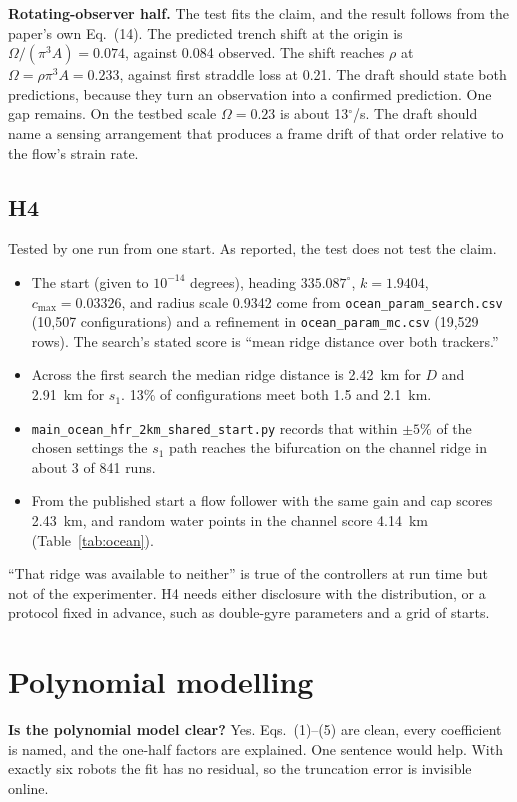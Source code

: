 \documentclass[10.5pt]{article}
\begin{document}
\textbf{Rotating-observer half.} The test fits the claim, and the result follows from the paper's own Eq.~(14). The predicted trench shift at the origin is $\Omega/(\pi^3A)=0.074$, against 0.084 observed. The shift reaches $\rho$ at $\Omega=\rho\pi^3A=0.233$, against first straddle loss at 0.21. The draft should state both predictions, because they turn an observation into a confirmed prediction. One gap remains. On the testbed scale $\Omega=0.23$ is about 13$^\circ$/s. The draft should name a sensing arrangement that produces a frame drift of that order relative to the flow's strain rate.

\subsection{H4}
Tested by one run from one start. As reported, the test does not test the claim.
\begin{itemize}[leftmargin=1.2em]
\item The start (given to $10^{-14}$ degrees), heading $335.087^\circ$, $k=1.9404$, $c_{\max}=0.03326$, and radius scale 0.9342 come from \texttt{ocean\_param\_search.csv} (10{,}507 configurations) and a refinement in \texttt{ocean\_param\_mc.csv} (19{,}529 rows). The search's stated score is ``mean ridge distance over both trackers.''
\item Across the first search the median ridge distance is 2.42~km for $D$ and 2.91~km for $s_1$. 13\% of configurations meet both 1.5 and 2.1~km.
\item \texttt{main\_ocean\_hfr\_2km\_shared\_start.py} records that within $\pm5\%$ of the chosen settings the $s_1$ path reaches the bifurcation on the channel ridge in about 3 of 841 runs.
\item From the published start a flow follower with the same gain and cap scores 2.43~km, and random water points in the channel score 4.14~km (Table~\ref{tab:ocean}).
\end{itemize}
``That ridge was available to neither'' is true of the controllers at run time but not of the experimenter. H4 needs either disclosure with the distribution, or a protocol fixed in advance, such as double-gyre parameters and a grid of starts.

\section{Polynomial modelling}

\textbf{Is the polynomial model clear?} Yes. Eqs.~(1)--(5) are clean, every coefficient is named, and the one-half factors are explained. One sentence would help. With exactly six robots the fit has no residual, so the truncation error is invisible online.
\end{document}
